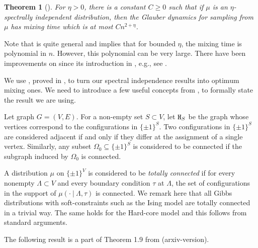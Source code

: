 \documentclass[11pt,reqno]{amsart}
\numberwithin{equation}{section}
\newtheorem{theorem}{Theorem}[section]
\begin{document}
\begin{theorem}[\cite{OptMCMCIS}]\label{thrm:SPCT-INDClosed}
For $\eta>0$, there is a constant $C\geq 0$ such that if $\mu$ is an $\eta$-spectrally independent distribution, 
then the Glauber dynamics for sampling from $\mu$ has {\em mixing time} which is at most $Cn^{2+\eta}$. 
\end{theorem} 

 

Note that  is quite general and implies that for bounded $\eta$, the mixing time is 
polynomial in $n$. However, this polynomial can be very large. There have been improvements on 
 since its introduction in \cite{OptMCMCIS}, e.g., see 
\cite{VigodaSpectralIndB,FastMCMCLocalisation,WeimingCoUbboundedDelta}. 



We use , proved in \cite{VigodaSpectralIndB}, to turn our spectral independence results into 
optimum mixing ones. 
%
We need to introduce a few useful concepts from \cite{VigodaSpectralIndB}, to formally state the result we are using.

Let graph $G=(V,E)$. For a non-empty set  $S\subset V$, let  ${\tt H}_S$ be the graph whose vertices correspond to 
 the configurations in $\{\pm 1\}^S$.  Two configurations in $\{\pm 1\}^S$ are considered adjacent 
 if and only if they differ at the assignment  of a single vertex.
% 
 Similarly, any subset $\Omega_0\subseteq \{\pm 1\}^S$ is considered to be connected if the subgraph
 induced by $\Omega_0$ is connected. 
 
 A distribution $\mu$ on $\{\pm 1\}^V$ is considered to be {\em totally
 connected} if for every nonempty $\Lambda \subset V$ and every boundary condition $\tau$ at $\Lambda$,
 the set of configurations in the support of $\mu(\cdot \ |\ \Lambda, \tau)$ is connected. 
%
We remark here that all Gibbs distributions with soft-constraints such as the Ising model are 
totally connected in a trivial way. The same holds for the Hard-core model and this follows from standard arguments. 


The following result is a part of Theorem 1.9 from \cite{VigodaSpectralIndB} (arxiv-version). 

 
\end{document}
